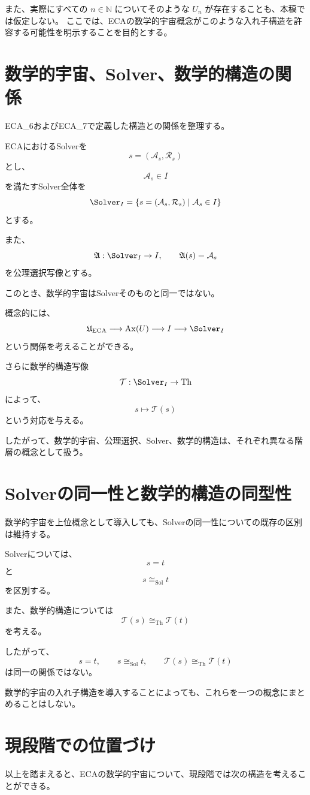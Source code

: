 \documentclass[11pt,a4paper]{article}
\begin{document}
また、実際にすべての $n\in\mathbb N$ についてそのような $U_n$ が存在することも、本稿では仮定しない。
ここでは、ECAの数学的宇宙概念がこのような入れ子構造を許容する可能性を明示することを目的とする。

\section{数学的宇宙、Solver、数学的構造の関係}
ECA_6およびECA_7で定義した構造との関係を整理する。

ECAにおけるSolverを
\[
s=(\mathcal{A}_s,\mathcal{R}_s)
\]
とし、
\[
\mathcal{A}_s\in I
\]
を満たすSolver全体を
\[
\Solver_I
=
\{s=(\mathcal{A}_s,\mathcal{R}_s)\mid
\mathcal{A}_s\in I\}
\]
とする。

また、
\[
\mathfrak{A}:\Solver_I\to I,
\qquad
\mathfrak{A}(s)=\mathcal{A}_s
\]
を公理選択写像とする。

このとき、数学的宇宙はSolverそのものと同一ではない。

概念的には、
\[
\mathfrak{U}_{\mathrm{ECA}}
\longrightarrow
\operatorname{Ax}(U)
\longrightarrow
I
\longrightarrow
\Solver_I
\]
という関係を考えることができる。

さらに数学的構造写像
\[
\mathcal{T}:\Solver_I\to\mathrm{Th}
\]
によって、
\[
s\longmapsto\mathcal{T}(s)
\]
という対応を与える。

したがって、数学的宇宙、公理選択、Solver、数学的構造は、それぞれ異なる階層の概念として扱う。

\section{Solverの同一性と数学的構造の同型性}

数学的宇宙を上位概念として導入しても、Solverの同一性についての既存の区別は維持する。

Solverについては、
\[
s=t
\]
と
\[
s\cong_{\mathrm{Sol}}t
\]
を区別する。

また、数学的構造については
\[
\mathcal{T}(s)\cong_{\mathrm{Th}}\mathcal{T}(t)
\]
を考える。

したがって、
\[
s=t,
\qquad
s\cong_{\mathrm{Sol}}t,
\qquad
\mathcal{T}(s)\cong_{\mathrm{Th}}\mathcal{T}(t)
\]
は同一の関係ではない。

数学的宇宙の入れ子構造を導入することによっても、これらを一つの概念にまとめることはしない。

\section{現段階での位置づけ}
以上を踏まえると、ECAの数学的宇宙について、現段階では次の構造を考えることができる。
\end{document}
